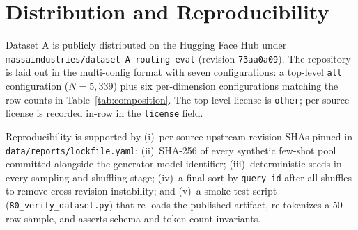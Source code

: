 \documentclass[11pt,a4paper]{article}
\begin{document}
\section{Distribution and Reproducibility}\label{sec:distribution}

Dataset A is publicly distributed on the Hugging Face Hub under \texttt{massaindustries/dataset-A-routing-eval} (revision \texttt{73aa0a09}). The repository is laid out in the multi-config format with seven configurations: a top-level \texttt{all} configuration ($N{=}5{,}339$) plus six per-dimension configurations matching the row counts in Table~\ref{tab:composition}. The top-level license is \texttt{other}; per-source license is recorded in-row in the \texttt{license} field.

Reproducibility is supported by (i)~per-source upstream revision SHAs pinned in \texttt{data/reports/lockfile.yaml}; (ii)~SHA-256 of every synthetic few-shot pool committed alongside the generator-model identifier; (iii)~deterministic seeds in every sampling and shuffling stage; (iv)~a final sort by \texttt{query\_id} after all shuffles to remove cross-revision instability; and (v)~a smoke-test script (\texttt{80\_verify\_dataset.py}) that re-loads the published artifact, re-tokenizes a 50-row sample, and asserts schema and token-count invariants.
\end{document}
